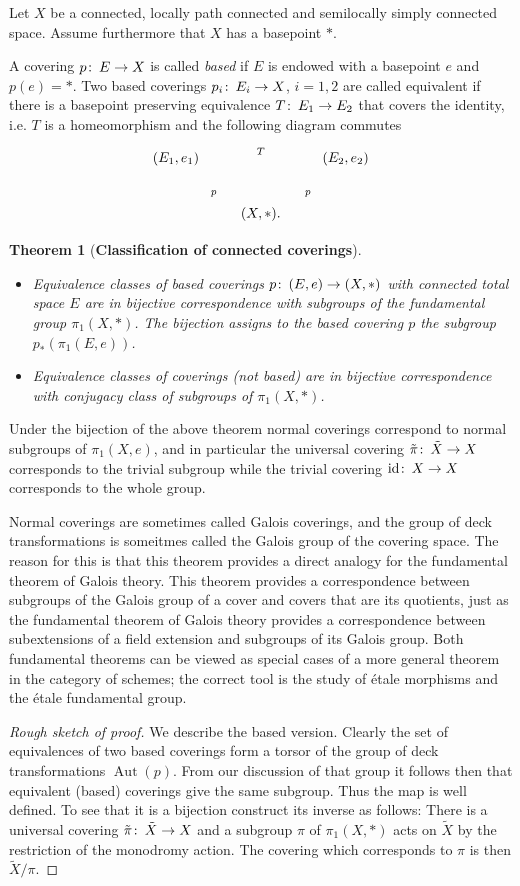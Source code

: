 \documentclass[12pt]{article}
\newtheorem*{Thm}{Theorem}
\theoremstyle{definition}
\theoremstyle{remark}
\numberwithin{equation}{subsection}
\newcommand{\Au}{ \operatorname{Aut}}
\newcommand{\id}{ \operatorname{id}}
\def\co{\colon\thinspace}
\begin{document}
Let $X$ be a connected, locally path connected and semilocally simply
connected space. Assume furthermore that $X$ has a basepoint $*$.

A covering $p\co E\to X$ is called \emph{based} if $E$ is endowed with a
basepoint $e$ and $p(e)=*$. Two based coverings $p_i\co E_i\to X$, $i=1,2$ are called
equivalent if there is a basepoint preserving equivalence $T\co E_1\to E_2$ that
covers the identity, i.e. $T$ is a homeomorphism and the following diagram
commutes
 $$\xymatrix{  {(E_1,e_1)}\ar[dr]_{p}\ar[rr]^{T}&&{(E_2,e_2)}\ar[dl]^{p}\\ 
 &{(X,*)}.&  }$$


\begin{Thm}[\textbf{Classification of connected coverings}]$ $
  \begin{itemize}
  \item  Equivalence classes of based coverings $p\co (E,e)\to (X,*)$ with connected total
  space $E$ are in bijective correspondence with subgroups of the
  fundamental group $\pi_1(X,*)$. The bijection assigns to the based covering
  $p$ the subgroup $p_*\left(\pi_1(E,e)\right)$.
\item Equivalence classes of coverings (not based) are in bijective
  correspondence with conjugacy class of subgroups of $\pi_1(X,*)$.
  \end{itemize}
  \end{Thm}

Under the bijection of the above theorem normal coverings correspond to
normal subgroups of $\pi_1(X,e)$, and in particular the universal covering
$\tilde \pi\co \tilde X\to X$
corresponds to the trivial subgroup while the trivial covering $\id\co X\to X$
corresponds to the whole group.

Normal coverings are sometimes called Galois coverings, and the group of deck transformations is someitmes called the Galois group of the covering space.  The reason for this is that this theorem provides a direct analogy for the fundamental theorem of Galois theory. This theorem provides a correspondence between subgroups of the Galois group of a cover and covers that are its quotients, just as the fundamental theorem of Galois theory provides a correspondence between subextensions of a field extension and subgroups of its Galois group. Both fundamental theorems can be viewed as special cases of a more general theorem in the category of schemes; the correct tool is the study of \'etale morphisms and the \'etale fundamental group.

\begin{proof}[Rough sketch of proof] We describe the based version.  
Clearly the set of equivalences of two based coverings form a torsor of the
group of deck transformations $\Au(p)$. From our discussion of that group it
follows then that equivalent (based) coverings give the same subgroup. Thus
the map is well defined. To see that it is a bijection construct its inverse
as follows: There is a universal covering $\tilde \pi\co \tilde X\to X$ and
a subgroup $\pi$ of $\pi_1(X,*)$ acts on $\tilde X$ by the restriction of
the monodromy action. The covering which corresponds to $\pi$ is then
$\tilde X/\pi$.
\end{proof}
\end{document}
